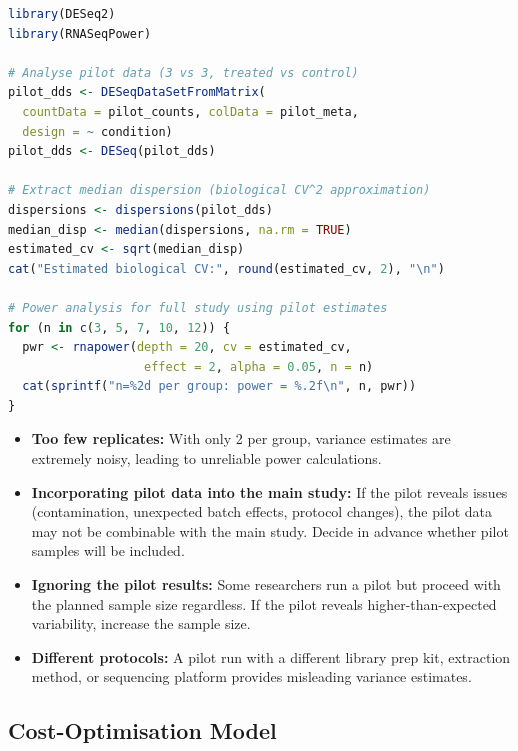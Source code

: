 \begin{lstlisting}[language=R,caption={Using pilot data to estimate dispersion and power the full study.},label=lst:pilot-power]
library(DESeq2)
library(RNASeqPower)

# Analyse pilot data (3 vs 3, treated vs control)
pilot_dds <- DESeqDataSetFromMatrix(
  countData = pilot_counts, colData = pilot_meta,
  design = ~ condition)
pilot_dds <- DESeq(pilot_dds)

# Extract median dispersion (biological CV^2 approximation)
dispersions <- dispersions(pilot_dds)
median_disp <- median(dispersions, na.rm = TRUE)
estimated_cv <- sqrt(median_disp)
cat("Estimated biological CV:", round(estimated_cv, 2), "\n")

# Power analysis for full study using pilot estimates
for (n in c(3, 5, 7, 10, 12)) {
  pwr <- rnapower(depth = 20, cv = estimated_cv,
                   effect = 2, alpha = 0.05, n = n)
  cat(sprintf("n=%2d per group: power = %.2f\n", n, pwr))
}
\end{lstlisting}

\begin{warningbox}[title={Common Pilot Study Mistakes}]
\begin{itemize}[nosep]
  \item \textbf{Too few replicates:} With only 2 per group, variance estimates are extremely noisy, leading to unreliable power calculations.
  \item \textbf{Incorporating pilot data into the main study:} If the pilot reveals issues (contamination, unexpected batch effects, protocol changes), the pilot data may not be combinable with the main study. Decide in advance whether pilot samples will be included.
  \item \textbf{Ignoring the pilot results:} Some researchers run a pilot but proceed with the planned sample size regardless. If the pilot reveals higher-than-expected variability, increase the sample size.
  \item \textbf{Different protocols:} A pilot run with a different library prep kit, extraction method, or sequencing platform provides misleading variance estimates.
\end{itemize}
\end{warningbox}

\subsection{Cost-Optimisation Model}
\label{subsec:expdesign:costmodel}

